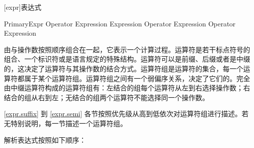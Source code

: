 
[expr]{表达式}

\begin{bnf}
 \br
    PrimaryExpr \br
    Operator Expression \br
    Expression Operator \br
    Expression Operator Expression \br
\end{bnf}

\pnum
{}由与操作数按照顺序组合在一起，它表示一个计算过程。运算符是若干标点符号的组合、一个标识符或是语言规定的特殊结构。运算符可以是前缀、后缀或者是中缀的，这决定了运算符与其操作数的结合方式。运算符组是运算符的集合，每一个运算符都属于某个运算符组。运算符组之间有一个弱偏序关系，决定了它们的。完全由中缀运算符构成的运算符组有：左结合的组每个运算符从左到右选择操作数；右结合的组从右到左；无结合的组两个运算符不能选择同一个操作数。

\pnum
\ref{expr.suffix} 到 \ref{expr.semi} 各节按照优先级从高到低依次对运算符组进行描述。若无特别说明，每一节描述一个运算符组。

\pnum
解析表达式按照如下顺序：

